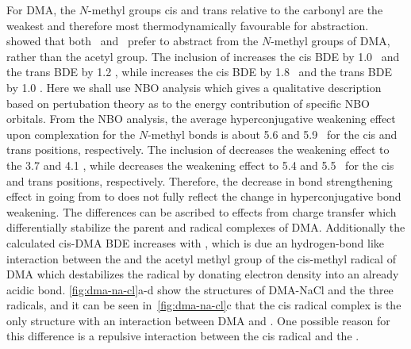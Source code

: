 For DMA, the $N$-methyl groups cis and trans relative to the carbonyl are the
weakest and therefore most thermodynamically favourable for abstraction.
\citet{Salamone2013} showed that both \bno\ and \cumo\ prefer to abstract from
the $N$-methyl groups of DMA, rather than the acetyl group. The inclusion of
 increases the cis BDE by 1.0 \kcalmol\ and the trans BDE by 1.2
\kcalmol, while  increases the cis BDE by 1.8 \kcalmol\ and the trans
BDE by 1.0 \kcalmol. Here we shall use NBO analysis which gives a qualitative
description based on pertubation theory as to the energy contribution of
specific NBO orbitals.\cite{Weinhold2016} From the NBO analysis, the average
hyperconjugative weakening effect upon complexation for the $N$-methyl 
bonds is about 5.6 and 5.9 \kcalmol\ for the cis and trans positions,
respectively. The inclusion of  decreases the weakening effect to the
3.7 and 4.1 \kcalmol, while  decreases the weakening effect to 5.4 and
5.5 \kcalmol\ for the cis and trans positions, respectively. Therefore, the
decrease in bond strengthening effect in going from  to  does
not fully reflect the change in hyperconjugative bond weakening. The
differences can be ascribed to effects from charge transfer which
differentially stabilize the parent and radical complexes of DMA. Additionally
the calculated cis-DMA BDE increases with , which is due an
hydrogen-bond like interaction between the  and the acetyl methyl
group of the cis-methyl radical of DMA which destabilizes the radical by
donating electron density into an already acidic  bond.
\ref{fig:dma-na-cl}a-d show the structures of DMA-NaCl and the three radicals,
and it can be seen in~\ref{fig:dma-na-cl}c that the cis radical complex is the
only structure with an interaction between DMA and .  One possible
reason for this difference is a repulsive interaction between the cis radical
and the .

